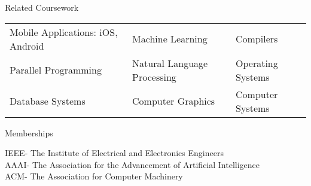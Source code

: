 \documentclass{resume}
\begin{document}
\begin{rSection}{Related Coursework}
\begin{tabularx}{\textwidth}{ X X X }
Mobile Applications: iOS, Android & Machine Learning & Compilers \\
Parallel Programming & Natural Language Processing & Operating Systems \\
Database Systems & Computer Graphics & Computer Systems \\
\end{tabularx}

\end{rSection}


\begin{rSection}{Memberships}

IEEE- The Institute of Electrical and Electronics Engineers \\
AAAI- The Association for the Advancement of Artificial Intelligence \\
ACM- The Association for Computer Machinery

\end{rSection}
\end{document}
